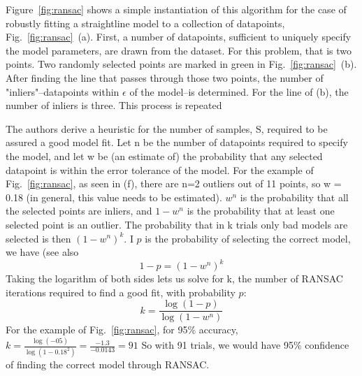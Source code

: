 Figure~\ref{fig:ransac} shows a simple instantiation of this algorithm for the case of robustly fitting a straightline model to a collection of datapoints, Fig.~\ref{fig:ransac}~(a).  First, a number of datapoints, sufficient to uniquely specify the model parameters, are drawn from the dataset.  For this problem, that is two points.  Two randomly selected points are marked in green in Fig.~\ref{fig:ransac}~(b).  After finding the line that passes through those two points, the number of "inliers"--datapoints within $\epsilon$ of the model--is determined.  For the line of (b), the number of inliers is three. This process is repeated

The authors derive a heuristic for the number of samples, S, required to be assured a good model fit.  Let n be the number of datapoints required to specify the model, and let w be (an estimate of) the probability that any selected datapoint is within the error tolerance of the model.   For the example of Fig.~\ref{fig:ransac}, as seen in (f), there are n=2 outliers out of 11 points, so w = 0.18 (in general, this value needs to be estimated).  $w^n$ is the probability that all the selected points are inliers, and $1 -  w^n$ is the probability that at least one selected point is an outlier.  The probability that in k trials only bad models are selected is then $(1 -  w^n)^k$.  I $p$ is the probability of selecting the correct model, we have (see also \cite{wikiRANSAC}
\begin{equation}
    1-p = (1 -  w^n)^k
\end{equation}
Taking the logarithm of both sides lets us solve for k, the number of RANSAC iterations required to find a good fit, with probability $p$:
\begin{equation}
        k = \frac{\log(1-p)}{\log(1-w^n)}
        \label{eq:k}
\end{equation}
For the example of Fig.~\ref{fig:ransac}, for 95\% accuracy, $k = \frac{\log(-05)}{\log(1-0.18^2)} = \frac{-1.3}{-0.0143} = 91$
So with 91 trials, we would have 95\% confidence of finding the correct model through RANSAC. 


